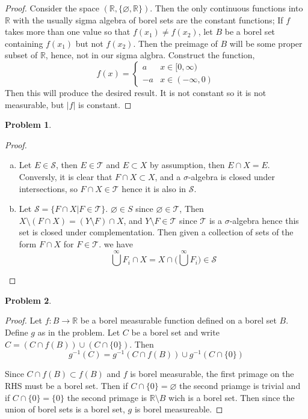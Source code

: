 \documentclass{article}
\newcommand{\R}{\mathbb{R}}
\newtheorem{prb}{Problem}
\begin{document}
\begin{proof}
	Consider the space $(\R, \{ \varnothing, \R\})$. Then the only continuous functions into $\R$ with the usually sigma algebra of borel sets are 
	the constant functions; If $f$ takes more than one value so that $f(x_1) \neq f(x_2)$, let $B$ be a borel set containing $f(x_1)$ but not $f(x_2)$. Then 
	the preimage of $B$ will be some proper subset of $\R$, hence, not in our sigma algbra. Construct the function, 
	\[
		f(x) =  \begin{cases}
			a & x \in [0, \infty) \\ 
			-a & x \in (-\infty, 0)
	         	\end{cases}
	\]
	Then this will produce the desired result. It is not constant so it is not measurable, but $|f|$ is constant.  

\end{proof}




 

\begin{prb}
	
\end{prb}

\begin{proof}
	\begin{enumerate}[(a)]
		\item 
			Let $E \in \mathcal{S}$, then $E \in \mathcal{T}$ and $E \subset X$ by assumption, then $E \cap X = E$. 
			Conversly, it is clear that $F \cap X \subset X$, and a $\sigma$-algebra is closed under intersections, 
			so $F \cap X \in \mathcal{T}$ hence it is also in $\mathcal{S}$. 
		\item	Let $\mathcal{S} = \{ F \cap X | F \in \mathcal{T} \}$.  
			$\varnothing \in S$ since $\varnothing \in \mathcal{T}$, Then $X \setminus (F \cap X) = (Y \setminus F) \cap X $, and 
			$Y \setminus F \in \mathcal{T}$ since $\mathcal{T}$ is a $\sigma$-algebra hence 
			this set is closed under complementation. Then given a collection of sets of the form $F \cap X$ for $F \in \mathcal{T}$. 
			we have 
			\[
				\bigcup^\infty F_i \cap X  = X \cap \Big( \bigcup^\infty F_i \Big) \in \mathcal{S}	
			\]
 	\end{enumerate}
\end{proof}


\begin{prb}
	
\end{prb}

\begin{proof}
	Let $f: B \to \R$ be a borel measurable function defined on a borel set $B$. Define $g$ as in the problem. 
	Let $C$ be a borel set and write $C = (C \cap f(B)) \cup (C \cap \{0\})$. 
	Then 
	\[
		g^{-1}(C) = g^{-1}(C \cap f(B)) \cup g^{-1}(C \cap \{0\})
	\]

	Since $C \cap f(B) \subset f(B)$ and $f$ is borel measurable, the first primage on the RHS must be a borel set. 
	Then if $C \cap \{0\} = \varnothing$ the second priamge is trivial and if $C \cap \{0\} = \{0\}$ the second primage is 
	$\R \setminus B$ wich is a borel set. Then since the union of borel sets is a borel set, $g$ is borel measureable. 
\end{proof}
\end{document}
